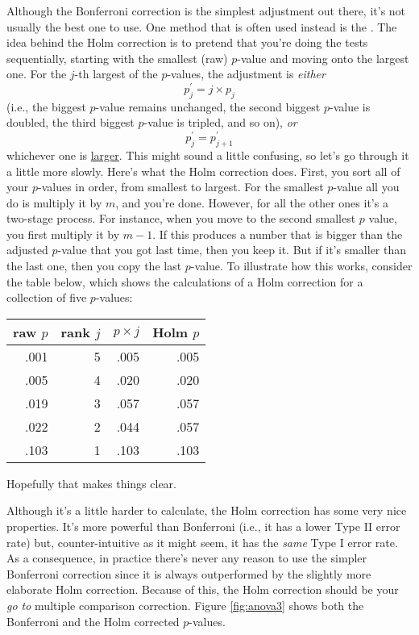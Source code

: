 Although the Bonferroni correction is the simplest adjustment out there, it's not usually the best one to use. One method that is often used instead is the  \parencite{Holm1979}. The idea behind the Holm correction is to pretend that you're doing the tests sequentially, starting with the smallest (raw) $p$-value and moving onto the largest one. For the $j$-th largest of the $p$-values, the adjustment is {\it either}
$$
p^\prime_j = j \times p_j 
$$
(i.e., the biggest $p$-value remains unchanged, the second biggest $p$-value is doubled, the third biggest $p$-value is tripled, and so on), {\it or}
$$
p^\prime_j = p^\prime_{j+1}
$$
whichever one is \underline{larger}. This might sound a little confusing, so let's go through it a little more slowly. Here's what the Holm correction does. First, you sort all of your $p$-values in order, from smallest to largest. For the smallest $p$-value all you do is multiply it by $m$, and you're done. However, for all the other ones it's a two-stage process. For instance, when you move to the second smallest $p$ value, you first multiply it by $m-1$. If this produces a number that is bigger than the adjusted $p$-value that you got last time, then you keep it. But if it's smaller than the last one, then you copy the last $p$-value. To illustrate how this works, consider the table below, which shows the calculations of a Holm correction for a collection of five $p$-values:
\begin{center}
\begin{tabular}{rrrr} 
 raw $p$ & rank $j$ & $p \times j$ & Holm $p$   \\ \hline
.001 & 5 & .005 & .005 \\
.005 & 4 & .020 & .020 \\
.019 & 3 & .057 & .057 \\
.022 & 2 & .044 & .057 \\
.103 & 1 & .103 & .103 \\
\end{tabular}
\end{center}
Hopefully that makes things clear. 

Although it's a little harder to calculate, the Holm correction has some very nice properties. It's more powerful than Bonferroni (i.e., it has a lower Type II error rate) but, counter-intuitive as it might seem, it has the {\it same} Type I error rate. As a consequence, in practice there's never any reason to use the simpler Bonferroni correction since it is always outperformed by the slightly more elaborate Holm correction. Because of this, the Holm correction should be your {\it go to} multiple comparison correction. Figure \ref{fig:anova3} shows both the Bonferroni and the Holm corrected $p$-values.

